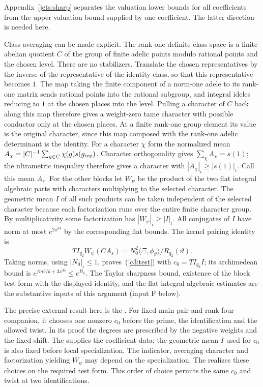 Appendix~\ref{jets:sharp} separates the valuation lower bounds
for all coefficients from the upper valuation bound supplied by
one coefficient. The latter direction is needed here.

Class averaging can be made explicit. The rank-one definite
class space is a finite abelian quotient $C$ of the group of finite adelic
points modulo rational points and the chosen level. There
are no stabilizers. Translate the chosen representatives by the
inverse of the representative of the identity class, so that
this representative becomes $1$. The map taking the finite component of a norm-one adele to its
rank-one matrix sends rational points into the rational subgroup,
and integral ideles reducing to $1$ at the chosen places into the
level. Pulling a character of $C$ back along this map therefore
gives a weight-zero tame character with possible conductor only at
the chosen places. At a finite rank-one group element its value is
the original character, since this map composed with the rank-one
adelic determinant is the identity. For a character $\chi$ form the
normalized mean $A_\chi=|C|^{-1}\sum_{g\in C}
\chi(g)s(g_{\rm rep})$. Character orthogonality gives
$\sum_\chi A_\chi=s(1)$; the ultrametric inequality therefore
gives a character with $|A_\chi|_\iota\ge|s(1)|_\iota$.
Call this mean $A_s$.
For the other blocks let $W_\psi$ be the product of the two flat
integral algebraic parts with characters multiplying to the selected
character. The geometric mean $I$ of all such products can be
taken independent of the selected character because each
factorization runs over the entire finite character group. By
multiplicativity some factorization has $|W_\psi|_\iota\ge|I|_\iota$.
All conjugates of $I$ have norm at most $e^{2x^{34}}$ by the
corresponding flat bounds. The kernel pairing identity is
\[
  T I_{q_2} W_\psi(C A_s)
    = N_0^2\langle\Xi,\phi_\vartheta\rangle/R_{q_2}(\vartheta).
\]
Taking norms, using $|N_0|_\iota\le1$, proves~(\ref{c3:test})
with $c_0=T I_{q_2} I$; its archimedean bound is
$e^{fmb/k+3x^{34}}\le e^{B_0}$.
The Taylor sharpness bound, existence of the block test form with
the displayed identity, and the flat integral algebraic estimates
are the substantive inputs of this argument (input F below).

The precise external result here is the
.
For fixed main pair and rank-four companion, it chooses one nonzero \(c_0\)
before the prime, the identification and the allowed twist. In its proof
the degrees are prescribed by the negative weights and the fixed shift.
The 
supplies the coefficient data; the geometric mean \(I\) used for \(c_0\)
is also fixed before local specialization. The indicator, averaging
character and factorization yielding \(W_\psi\) may depend on the
specialization. The
realizes these choices on the required test form. This order of choice
permits the same \(c_0\) and twist at two identifications.

